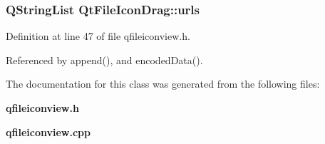 \subsubsection{\setlength{\rightskip}{0pt plus 5cm}QString\-List {\bf Qt\-File\-Icon\-Drag::urls}\hspace{0.3cm}{\tt  [private]}}\label{classQtFileIconDrag_QtFileIconDragr0}




Definition at line 47 of file qfileiconview.h.

Referenced by append(), and encoded\-Data().

The documentation for this class was generated from the following files:\begin{CompactItemize}
\item 
{\bf qfileiconview.h}\item 
{\bf qfileiconview.cpp}\end{CompactItemize}
